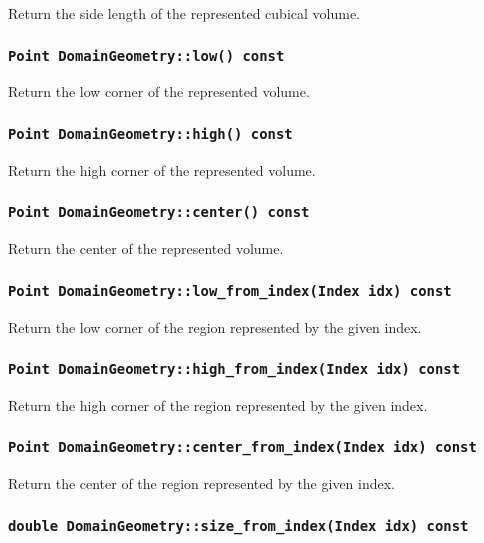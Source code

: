 Return the side length of the represented cubical volume.

\subsubsection{\texttt{Point DomainGeometry::low() const}}

Return the low corner of the represented volume.

\subsubsection{\texttt{Point DomainGeometry::high() const}}

Return the high corner of the represented volume.

\subsubsection{\texttt{Point DomainGeometry::center() const}}

Return the center of the represented volume.

\subsubsection{\texttt{Point DomainGeometry::low\_from\_index(Index idx) const}}

Return the low corner of the region represented by the given index.

\subsubsection{\texttt{Point DomainGeometry::high\_from\_index(Index idx) const}}

Return the high corner of the region represented by the given index.

\subsubsection{\texttt{Point DomainGeometry::center\_from\_index(Index idx) const}}

Return the center of the region represented by the given index.

\subsubsection{\texttt{double DomainGeometry::size\_from\_index(Index idx) const}}

